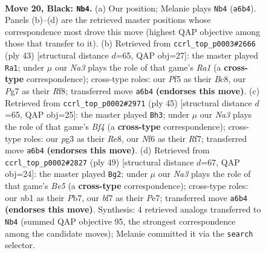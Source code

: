 \documentclass[11pt]{article}
\begin{document}
\clearpage

\begin{figure}[p]\centering
\begin{subfigure}{0.46\textwidth}\centering
\resizebox{\linewidth}{!}{%
\newchessgame
\chessboard[
  setfen={r1b4k/pp3Bpp/n2b1n2/P4p2/5P2/1P2P1P1/8/RNB2RK1 b - - 0 20},
  showmover=false,
  pgfstyle=straightmove, color=movearrow, markmove={a6-b4}
]}
\caption{}
\end{subfigure}\hfill
\begin{subfigure}{0.46\textwidth}\centering
\resizebox{\linewidth}{!}{%
\newchessgame
\chessboard[
  setfen={r1b2r2/1p3p1k/2n3p1/1N2n2p/4P2P/1P3P2/6P1/2NRKB1R b K - 1 22},
  showmover=false,
  pgfstyle=straightmove, color=movearrow, markmove={a8-a1}
]}
\caption{}
\end{subfigure}
\\[4pt]
\begin{subfigure}{0.46\textwidth}\centering
\resizebox{\linewidth}{!}{%
\newchessgame
\chessboard[
  setfen={4r3/ppp2rkp/2np2p1/3N1b2/2P2P2/5BP1/PP1R3P/5RK1 b - - 2 23},
  showmover=false,
  pgfstyle=straightmove, color=movearrow, markmove={f5-h3}
]}
\caption{}
\end{subfigure}\hfill
\begin{subfigure}{0.46\textwidth}\centering
\resizebox{\linewidth}{!}{%
\newchessgame
\chessboard[
  setfen={7r/1p2pk1p/1npp2p1/p5P1/P3b1P1/2P5/1P2BP2/R3KR2 b Q - 0 25},
  showmover=false,
  pgfstyle=straightmove, color=movearrow, markmove={e4-g2}
]}
\caption{}
\end{subfigure}
\caption{\textbf{Move 20, Black: \texttt{Nb4}.} (a) Our position; Melanie plays \texttt{Nb4} (\texttt{a6b4}). Panels (b)--(d) are the retrieved master positions whose correspondence most drove this move (highest QAP objective among those that transfer to it). (b) Retrieved from \texttt{ccrl\_top\_p0003\#2666} (ply 43) [structural distance $d$=65, QAP obj=27]: the master played \texttt{Ra1}; under $\mu$ our \emph{Na3} plays the role of that game's \emph{Ra1} (a \textbf{cross-type} correspondence); cross-type roles: our \emph{P}f5 as their \emph{B}c8, our \emph{P}g7 as their \emph{R}f8; transferred move \texttt{a6b4} \textbf{(endorses this move)}. (c) Retrieved from \texttt{ccrl\_top\_p0002\#2971} (ply 45) [structural distance $d$=65, QAP obj=25]: the master played \texttt{Bh3}; under $\mu$ our \emph{Na3} plays the role of that game's \emph{Bf4} (a \textbf{cross-type} correspondence); cross-type roles: our \emph{p}g3 as their \emph{R}e8, our \emph{N}f6 as their \emph{R}f7; transferred move \texttt{a6b4} \textbf{(endorses this move)}. (d) Retrieved from \texttt{ccrl\_top\_p0002\#2827} (ply 49) [structural distance $d$=67, QAP obj=24]: the master played \texttt{Bg2}; under $\mu$ our \emph{Na3} plays the role of that game's \emph{Be5} (a \textbf{cross-type} correspondence); cross-type roles: our \emph{n}b1 as their \emph{P}b7, our \emph{b}f7 as their \emph{P}e7; transferred move \texttt{a6b4} \textbf{(endorses this move)}. Synthesis: 4 retrieved analogs transferred to \texttt{Nb4} (summed QAP objective 95, the strongest correspondence among the candidate moves); Melanie committed it via the \texttt{search} selector.}
\label{fig:thought-m39}
\end{figure}
\end{document}
